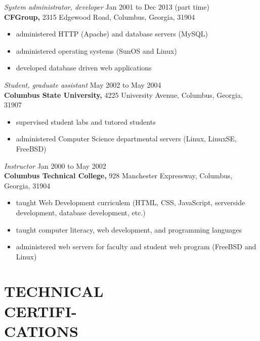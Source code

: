 \documentclass[margin, 10pt]{res} %
\begin{document}
\begin{resume}
{\it System administrator, developer} \hfill Jan 2001 to Dec 2013 (part time) \\
\textbf{CFGroup,} 2315 Edgewood Road, Columbus, Georgia, 31904

\begin{itemize} \itemsep -2pt %
\item administered HTTP (Apache) and database servers (MySQL)
\item administered operating systems (SunOS and Linux)
\item developed database driven web applications
\end{itemize}
 
{\it Student, graduate assistant} \hfill May 2002 to May 2004 \\
\textbf{Columbus State University,} 4225 University Avenue, Columbus, Georgia, 31907

\begin{itemize} \itemsep -2pt %
\item supervised student labs and tutored students
\item administered Computer Science departmental servers (Linux, LinuxSE, FreeBSD)
\end{itemize}

{\it Instructor} \hfill Jan 2000 to May 2002 \\
\textbf{Columbus Technical College,} 928 Manchester Expressway, Columbus, Georgia, 31904

\begin{itemize} \itemsep -2pt %
        \item taught Web Development curriculem (HTML, CSS, JavaScript, serverside development, database development, etc.)
\item taught computer literacy, web development, and programming languages
\item administered web servers for faculty and student web program (FreeBSD and Linux)
\end{itemize}


\section{TECHNICAL\\CERTIFI-\\CATIONS\\
}


\end{resume}
\end{document}
